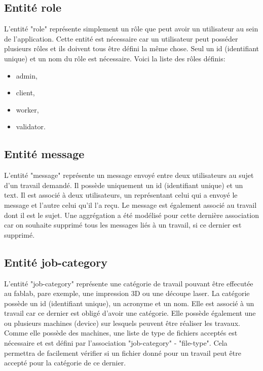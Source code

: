 \documentclass[
    iai, %
    il, %
]{heig-tb}
\begin{document}
\subsection{Entité role}
L'entité "role" représente simplement un rôle que peut avoir un utilisateur au sein de l'application. Cette entité est nécessaire car un utilisateur peut posséder plusieurs rôles et ils doivent tous être défini la même chose.\newline
Seul un id (identifiant unique) et un nom du rôle est nécessaire.\newline
Voici la liste des rôles définis:
\begin{itemize}
    \item admin,
    \item client,
    \item worker,
    \item validator.
\end{itemize}

\subsection{Entité message}
L'entité "message" représente un message envoyé entre deux utilisateurs au sujet d'un travail demandé.\newline
Il possède uniquement un id (identifiant unique) et un text.\newline
Il est associé à deux utilisateurs, un représentant celui qui a envoyé le message et l'autre celui qu'il l'a reçu. Le message est également associé au travail dont il est le sujet.\newline
Une aggrégation a été modélisé pour cette dernière association car on souhaite supprimé tous les messages liés à un travail, si ce dernier est supprimé.

\subsection{Entité job-category}
L'entité "job-category" représente une catégorie de travail pouvant être effecutée au fablab, pare exemple, une impression 3D ou une découpe laser.\newline
La catégorie possède un id (identifiant unique), un acronyme et un nom.\newline
Elle est associé à un travail car ce dernier est obligé d'avoir une catégorie.\newline
Elle possède également une ou plusieurs machines (device) sur lesquels peuvent être réaliser les travaux.\newline
Comme elle possède des machines, une liste de type de fichiers acceptés est nécessaire et est défini par l'association "job-category" - "file-type". Cela permettra de facilement vérifier si un fichier donné pour un travail peut être accepté pour la catégorie de ce dernier.
\end{document}
